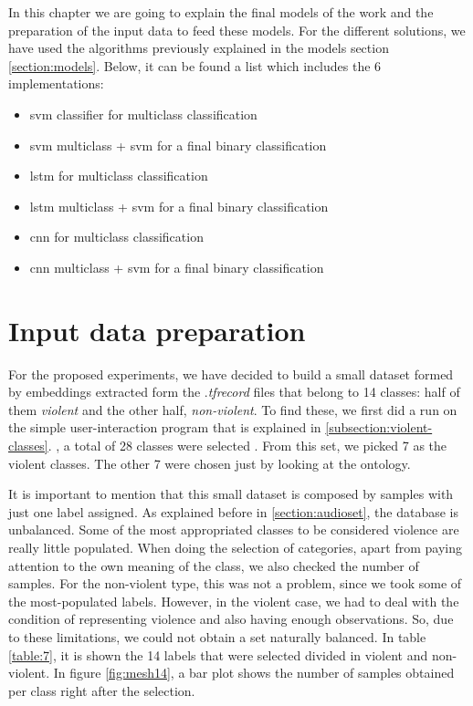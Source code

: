 
	In this chapter we are going to explain the final models of the work and the preparation of the input data to feed these models. For the different solutions, we have used the algorithms previously explained in the models section \ref{section:models}. Below, it can be found a list which includes the 6 implementations:
	
	\begin{itemize}
		\item \acrshort{svm} classifier for multiclass classification
		\item \acrshort{svm} multiclass + \acrshort{svm} for a final binary classification
		\item \acrshort{lstm} for multiclass classification
		\item \acrshort{lstm} multiclass + \acrshort{svm} for a final binary classification
		\item \acrshort{cnn} for multiclass classification
		\item \acrshort{cnn} multiclass + \acrshort{svm} for a final binary classification
	\end{itemize}
	

\section{Input data preparation}
\label{section:input-data-preparation}

	For the proposed experiments, we have decided to build a small dataset formed by embeddings extracted form the .\textit{tfrecord} files that belong to 14 classes: half of them \textit{violent} and the other half, \textit{non-violent}. To find these, we first did a run on the simple user-interaction program that is explained in \ref{subsection:violent-classes}. , a total of 28 classes were selected . From this set, we picked 7 as the violent classes. The other 7 were chosen just by looking at the ontology.
	
	It is important to mention that this small dataset is composed by samples with just one label assigned. As explained before in \ref{section:audioset}, the database is unbalanced. Some of the most appropriated classes to be considered violence are really little populated. When doing the selection of categories, apart from paying attention to the own meaning of the class, we also checked the number of samples. For the non-violent type, this was not a problem, since we took some of the most-populated labels. However, in the violent case, we had to deal with the condition of representing violence and also having enough observations. So, due to these limitations, we could not obtain a set naturally balanced. In table \ref{table:7}, it is shown the 14 labels that were selected divided in violent and non-violent. In figure \ref{fig:mesh14}, a bar plot shows the number of samples obtained per class right after the selection. 
	
